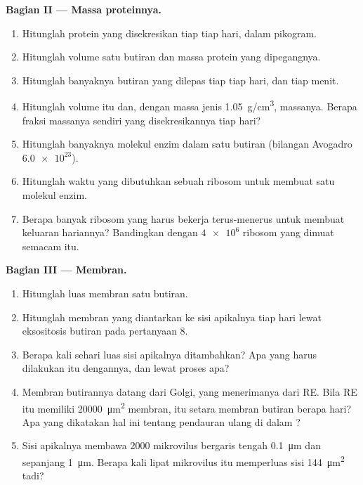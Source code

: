 \begin{problem}
\medskip
\noindent\textbf{Bagian II --- Massa proteinnya.}
\begin{enumerate}[resume]
  \item Hitunglah protein yang disekresikan tiap  tiap hari, dalam
        pikogram.
  \item Hitunglah volume satu butiran dan massa protein yang
        dipegangnya.
  \item Hitunglah banyaknya butiran yang dilepas tiap  tiap hari,
        dan tiap menit.
  \item Hitunglah volume  itu dan, dengan massa jenis
        \qty{1.05}{g/cm^3}, massanya. Berapa fraksi massanya sendiri
        yang disekresikannya tiap hari?
  \item Hitunglah banyaknya molekul enzim dalam satu butiran (bilangan
        Avogadro $\num{6.0e23}$).
  \item Hitunglah waktu yang dibutuhkan sebuah ribosom untuk membuat
        satu molekul enzim.
  \item Berapa banyak ribosom yang harus bekerja terus-menerus untuk
        membuat keluaran hariannya? Bandingkan dengan $\num{4e6}$
        ribosom yang dimuat  semacam itu.
\end{enumerate}

\medskip
\noindent\textbf{Bagian III --- Membran.}
\begin{enumerate}[resume]
  \item Hitunglah luas membran satu butiran.
  \item Hitunglah membran yang diantarkan ke sisi apikalnya tiap hari
        lewat eksositosis butiran pada pertanyaan 8.
  \item Berapa kali sehari luas sisi apikalnya ditambahkan? Apa yang
        harus dilakukan  itu dengannya, dan lewat proses apa?
  \item Membran butirannya datang dari Golgi, yang menerimanya dari RE.
        Bila RE  itu memiliki \qty{20000}{\micro m^2} membran, itu
        setara membran butiran berapa hari? Apa yang dikatakan hal ini
        tentang pendauran ulang di dalam ?
  \item Sisi apikalnya membawa \qty{2000}{} mikrovilus bergaris tengah
        \qty{0.1}{\micro m} dan sepanjang \qty{1}{\micro m}. Berapa kali
        lipat mikrovilus itu memperluas sisi \qty{144}{\micro m^2} tadi?
\end{enumerate}


\end{problem}
